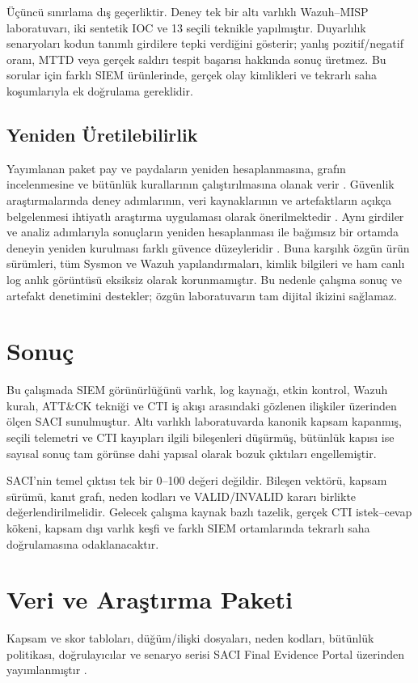 \documentclass[conference]{IEEEtran}
\begin{document}
Üçüncü sınırlama dış geçerliktir. Deney tek bir altı varlıklı Wazuh--MISP laboratuvarı, iki sentetik IOC ve 13 seçili teknikle yapılmıştır. Duyarlılık senaryoları kodun tanımlı girdilere tepki verdiğini gösterir; yanlış pozitif/negatif oranı, MTTD veya gerçek saldırı tespit başarısı hakkında sonuç üretmez. Bu sorular için farklı SIEM ürünlerinde, gerçek olay kimlikleri ve tekrarlı saha koşumlarıyla ek doğrulama gereklidir.

\subsection{Yeniden Üretilebilirlik}
Yayımlanan paket pay ve paydaların yeniden hesaplanmasına, grafın incelenmesine ve bütünlük kurallarının çalıştırılmasına olanak verir \cite{saciartifact}. Güvenlik araştırmalarında deney adımlarının, veri kaynaklarının ve artefaktların açıkça belgelenmesi ihtiyatlı araştırma uygulaması olarak önerilmektedir \cite{rossow2012}. Aynı girdiler ve analiz adımlarıyla sonuçların yeniden hesaplanması ile bağımsız bir ortamda deneyin yeniden kurulması farklı güvence düzeyleridir \cite{nasem2019}. Buna karşılık özgün ürün sürümleri, tüm Sysmon ve Wazuh yapılandırmaları, kimlik bilgileri ve ham canlı log anlık görüntüsü eksiksiz olarak korunmamıştır. Bu nedenle çalışma sonuç ve artefakt denetimini destekler; özgün laboratuvarın tam dijital ikizini sağlamaz.

\section{Sonuç}
Bu çalışmada SIEM görünürlüğünü varlık, log kaynağı, etkin kontrol, Wazuh kuralı, ATT\&CK tekniği ve CTI iş akışı arasındaki gözlenen ilişkiler üzerinden ölçen SACI sunulmuştur. Altı varlıklı laboratuvarda kanonik kapsam kapanmış, seçili telemetri ve CTI kayıpları ilgili bileşenleri düşürmüş, bütünlük kapısı ise sayısal sonuç tam görünse dahi yapısal olarak bozuk çıktıları engellemiştir.

SACI'nin temel çıktısı tek bir 0--100 değeri değildir. Bileşen vektörü, kapsam sürümü, kanıt grafı, neden kodları ve VALID/INVALID kararı birlikte değerlendirilmelidir. Gelecek çalışma kaynak bazlı tazelik, gerçek CTI istek--cevap kökeni, kapsam dışı varlık keşfi ve farklı SIEM ortamlarında tekrarlı saha doğrulamasına odaklanacaktır.

\section*{Veri ve Araştırma Paketi}
Kapsam ve skor tabloları, düğüm/ilişki dosyaları, neden kodları, bütünlük politikası, doğrulayıcılar ve senaryo serisi SACI Final Evidence Portal üzerinden yayımlanmıştır \cite{saciartifact}.



\end{document}
